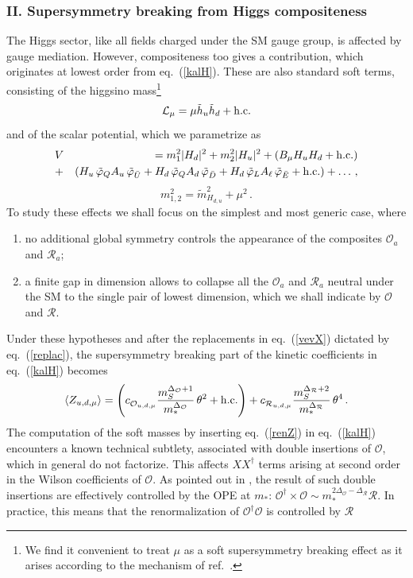 \documentclass[a4paper,12pt]{article}
\newcommand{\hc}{{\rm h.c.}}
\newcommand{\bea}{\begin{eqnarray}}
\newcommand{\eea}{\end{eqnarray}}
\newcommand{\beq}{\begin{equation}}
\newcommand{\eeq}{\end{equation}}
\def\eq#1{eq.~(\ref{#1})}
\def\eq#1{eq.~(\ref{#1})}
\def\O{\mathcal{O}}
\def\R{\mathcal{R}}
\def\mst{m_*}
\def\mS{m_S}
\begin{document}
\subsubsection*{II. Supersymmetry breaking  from  Higgs compositeness}
The Higgs sector, like all fields charged under the SM gauge group, is affected by gauge mediation. However, compositeness too gives a contribution, which originates at lowest order  from \eq{kalH}. These are also standard soft terms, consisting of the higgsino mass\footnote{We find it convenient to treat $\mu$ as a soft  supersymmetry breaking effect as it arises according to the mechanism of ref.~\cite{Giudice:1988yz}.}
\beq
{\cal L}_\mu = \mu \tilde h_u\tilde h_d+{\mathrm{h.c.}}
\eeq
and of the scalar potential, which we parametrize as 
\bea
&V& = m_1^2 |H_d|^2 + m_2^2 |H_u|^2 +\left( B_\mu H_u H_d + \hc \right)
\nonumber\\
&+&\left(  H_u \,{\tilde \varphi}_Q A_u \,{\tilde \varphi}_{\bar U} +  H_d \,{\tilde \varphi}_Q A_d \,{\tilde \varphi}_{\bar D} + H_d \,{\tilde \varphi}_L A_\ell \,{\tilde \varphi}_{\bar E} + \hc \right) + \dots \, ,
\eea
\beq
m_{1,2}^2 = {\tilde m}_{H_{d,u}}^2 + \mu^2 \, .
\label{defm12}
\eeq
To study these effects we shall focus on the simplest and most generic case, where  
\begin{enumerate}
\item no additional global symmetry controls the appearance of the   composites $\O_a$ and $\R_a$;
\item   a finite gap in dimension allows to collapse all the $\O_a$ and $\R_a$ neutral under the SM to the single pair  of  lowest dimension, which we shall indicate by $\O$ and $\R$.
\end{enumerate}
Under these hypotheses and after the replacements in \eq{vevX} dictated by \eq{replac},  the supersymmetry breaking part of the kinetic coefficients in \eq{kalH} becomes
\beq
\langle Z_{u,d,\mu} \rangle =  \left( c_{\raisebox{-1.0pt}{$\scriptstyle {{\O}_{u,d,\mu}}$}}
 \frac{\mS^{\Delta_\O +1}}{\mst^{\Delta_\O}}\, \theta^2 +\hc \right) + 
 c_{\raisebox{-1.0pt}{$\scriptstyle {{\R}_{u,d,\mu}}$}} \frac{\mS^{\Delta_\R +2}}{\mst^{\Delta_\R}}\, \theta^4\, .
\label{renZ}
\eeq
The computation of the soft masses by inserting \eq{renZ} in \eq{kalH} encounters a  known technical subtlety,  associated with double insertions of $\O$, which in general do not factorize. This affects $X X^\dagger$ terms arising at second order in the Wilson coefficients of $\O$. 
As pointed out in \cite{Perez:2008ng,Murayama:2007ge,Craig:2009rk}, the result of such double insertions are effectively controlled by the OPE at $\mst$: $\O^\dagger \times \O \sim \mst^{2\Delta_\O-\Delta_\R} \R$. In practice, this means that the renormalization of  $\O^\dagger \O$ is controlled by  $\R$ 
\end{document}
